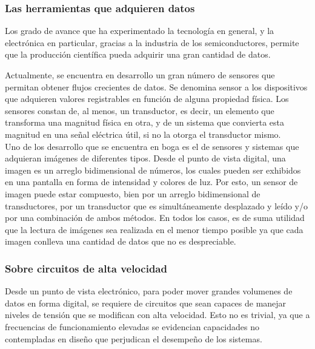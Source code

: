\subsubsection*{Las herramientas que adquieren datos}
Los grado de avance que ha experimentado la tecnología en general, y la electrónica en particular, gracias a la industria de los semiconductores, permite que la producción científica pueda adquirir una gran cantidad de datos. %

Actualmente, se encuentra en desarrollo un gran número de sensores que permitan obtener flujos crecientes de datos. Se denomina sensor a los dispositivos que  adquieren valores registrables en función de alguna propiedad física. Los sensores constan de, al menos, un transductor, es decir, un elemento que transforma una magnitud física en otra, y de un sistema que convierta esta magnitud en una señal eléctrica útil, si no la otorga el transductor mismo.\\

Uno de los desarrollo que se encuentra en boga es el de sensores y sistemas que adquieran imágenes de diferentes tipos. Desde el punto de vista digital, una imagen es un arreglo bidimensional de números, los cuales pueden ser exhibidos en una pantalla en forma de intensidad y colores de luz. Por esto, un sensor de imagen puede estar compuesto, bien por un arreglo bidimensional de transductores, por un transductor que es simultáneamente desplazado y leído y/o por una combinación de ambos métodos. En todos los casos, es de suma utilidad que la lectura de imágenes sea realizada en el menor tiempo posible ya que cada imagen conlleva una cantidad de datos que no es despreciable.\\

\subsubsection*{Sobre circuitos de alta velocidad}
Desde un punto de vista electrónico, para poder mover grandes volumenes de datos en forma digital, se requiere de circuitos que sean capaces de manejar niveles de tensión que se modifican con alta velocidad. Esto no es trivial, ya que a frecuencias de funcionamiento elevadas se evidencian capacidades no contempladas en diseño que perjudican el desempeño de los sistemas.\\

